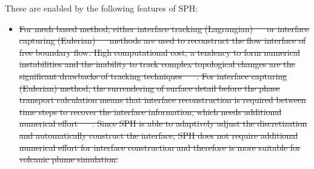 \documentclass[gmd, manuscript]{copernicus} %
\providecommand{\DIFdel}[1]{{\protect\color{red}\sout{#1}}}                      %
\providecommand{\DIFaddend}{} %
\providecommand{\DIFdelbegin}{} %
\begin{document}
\DIFaddend These are enabled by the following features of SPH:
\begin{itemize}
\item \DIFdelbegin \DIFdel{For mesh based method, either interface tracking (Lagrangian) \mbox{%
\citep{harlow1965numerical, wrobel1991computational, cheng1995simplified}
}%
or interface capturing (Eulerian) \mbox{%
\citep{hirt1981volume, youngs1982time, gerlach2006comparison, gopala2008volume}
}%
methods are used to reconstruct the flow interface of free boundary flow. High computational cost, a tendency to form numerical instabilities and the inability to track complex topological changes are the significant drawbacks of tracking techniques \mbox{%
\citep{hirt1981volume, unverdi1992front, anderson1998diffuse}
}%
. For interface capturing (Eulerian) method, the surrendering of surface detail before the phase transport calculation means that interface reconstruction is required between time steps to recover the interface information, which needs additional numerical effort \mbox{%
\citep{hirt1981volume, youngs1982time}
}%
. Since SPH is able to adaptively adjust the discretization and automatically construct the interface, SPH does not require additional numerical effort for interface construction and therefore is more suitable for volcanic plume simulation.
}%

\end{itemize}
\end{document}
